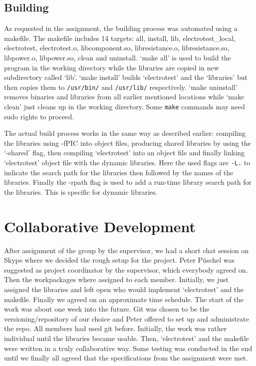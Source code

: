 \documentclass[a4paper,11pt,twoside]{article}
\begin{document}
\subsection{Building}
As requested in the assignment, the building process was automated using a makefile. The makefile includes 14 targets: all, install, lib, electrotest\_local, electrotest, electrotest.o, libcomponent.so, libresistance.o, libresistance.so, libpower.o, libpower.so, clean and uninstall. `make all' is used to build the program in the working directory while the libraries are copied in new subdirectory called `lib'. `make install' builds `electrotest' and the `libraries' but then copies them to \verb+/usr/bin/+ and \verb+/usr/lib/+ respectively. `make uninstall' removes binaries and libraries from all earlier mentioned locations while `make clean' just cleans up in the working directory. Some \verb+make+ commands may need sudo rights to proceed.

The actual build process works in the same way as described earlier: compiling the libraries using -fPIC into object files, producing shared libraries by using the `-shared' flag, then compiling `electrotest' into an object file and finally linking `electrotest' object file with the dynamic libraries. Here the used flags are \verb+-L.+ to indicate the search path for the libraries then followed by the names of the libraries. Finally the -rpath flag is used to add a run-time library search path for the libraries. This is specific for dynamic libraries.  

 
\section{Collaborative Development}
After assignment of the group by the supervisor, we had a short chat session on Skype where we decided the rough setup for the project. Peter Püschel was suggested as project coordinator by the supervisor, which everybody agreed on. Then the workpackages where assigned to each member. Initially, we just assigned the libraries and left open who would implement `electrotest' and the makefile. Finally we agreed on an approximate time schedule. The start of the work was about one week into the future. Git was chosen to be the versioning/repository of our choice and Peter offered to set up and administrate the repo. All members had used git before.
Initially, the work was rather individual until the libraries became usable. Then, `electrotest' and the makefile were written in a truly collaborative way. Some testing was conducted in the end until we finally all agreed that the specifications from the assignment were met. 
\end{document}
